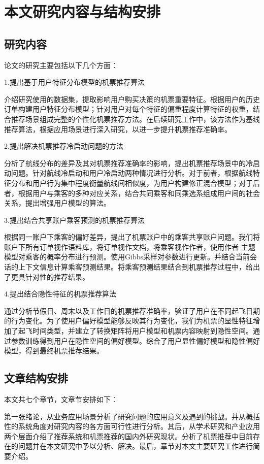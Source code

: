 \section{本文研究内容与结构安排}
\subsection{研究内容}
论文的研究主要包括以下几个方面：

1.提出基于用户特征分布模型的机票推荐算法

介绍研究使用的数据集，提取影响用户购买决策的机票重要特征。根据用户的历史订单构建用户特征分布模型；针对用户对每个特征的偏重程度计算特征的权重，结合推荐场景组成完整的个性化机票推荐方法。在后续研究工作中，该方法作为基线推荐算法，根据应用场景进行深入研究，以进一步提升机票推荐准确率。

2.提出解决机票推荐冷启动问题的方法

分析了航线分布的差异及其对机票推荐准确率的影响，提出机票推荐场景中的冷启动问题。针对航线冷启动和用户冷启动两种情况进行分析。对于前者，根据航线特征分布和用户行为集中程度衡量航线间相似度，为用户构建修正混合模型；对于后者，根据用户与乘客的多种对应关系，结合共同乘客和同乘选系组成用户间的社会关系，提出增强用户模型的算法。


3.提出结合共享账户乘客预测的机票推荐算法

根据同一账户下乘客的偏好差异，提出了机票账户中的乘客共享账户问题。我们将账户下所有订单视作语料库，将订单视作文档，将乘客视作作者，使用作者-主题模型对乘客的概率分布进行预测。使用Gibbs采样对参数进行更新。并结合当前会话的上下文信息计算乘客预测结果。将乘客预测结果结合到机票推荐过程中，给出了更具针对性的推荐结果。

4.提出结合隐性特征的机票推荐算法

通过分析节假日、周末以及工作日的机票推荐准确率，验证了用户在不同起飞日期的行为变化。为了使用户偏好模型能够反映其行为变化，我们为机票的显性特征增加了起飞时间类型，并建立了转换矩阵将用户模型和机票内容映射到隐性空间。通过参数训练得到用户在隐性空间的偏好模型。综合了用户显性偏好模型和隐性偏好模型，得到最终机票推荐结果。


\subsection{文章结构安排}
本文共七个章节，文章节安排如下：

第一张绪论，从业务应用场景分析了研究问题的应用意义及遇到的挑战。并从概括性的系统角度对研究内容的各方面可行性进行分析。其后，从学术研究和产业应用两个层面介绍了推荐系统和机票推荐的国内外研究现状。分析了机票推荐中目前存在的问题并在本文研究中予以分析、解决。最后，章节对本文主要研究工作进行简要介绍。

